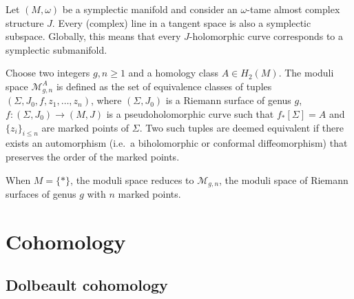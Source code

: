     \begin{property}
        Let $(M,\omega)$ be a symplectic manifold and consider an $\omega$-tame almost complex structure $J$. Every (complex) line in a tangent space is also a symplectic subspace. Globally, this means that every $J$-holomorphic curve corresponds to a symplectic submanifold.
    \end{property}


    \begin{construct}
        Choose two integers $g,n\geq1$ and a homology class $A\in H_2(M)$. The moduli space $\mathcal{M}^A_{g,n}$ is defined as the set of equivalence classes of tuples $(\Sigma,J_0,f,z_1,\ldots,z_n)$, where $(\Sigma,J_0)$ is a Riemann surface of genus $g$, $f:(\Sigma,J_0)\rightarrow(M,J)$ is a pseudoholomorphic curve such that $f_*[\Sigma]=A$ and $\{z_i\}_{i\leq n}$ are marked points of $\Sigma$. Two such tuples are deemed equivalent if there exists an automorphism (i.e.~a biholomorphic or conformal diffeomorphism) that preserves the order of the marked points.
    \end{construct}
    \begin{example}
        When $M=\{\ast\}$, the moduli space reduces to $\mathcal{M}_{g,n}$, the moduli space of Riemann surfaces of genus $g$ with $n$ marked points.
    \end{example}

\section{Cohomology}
\subsection{Dolbeault cohomology}

